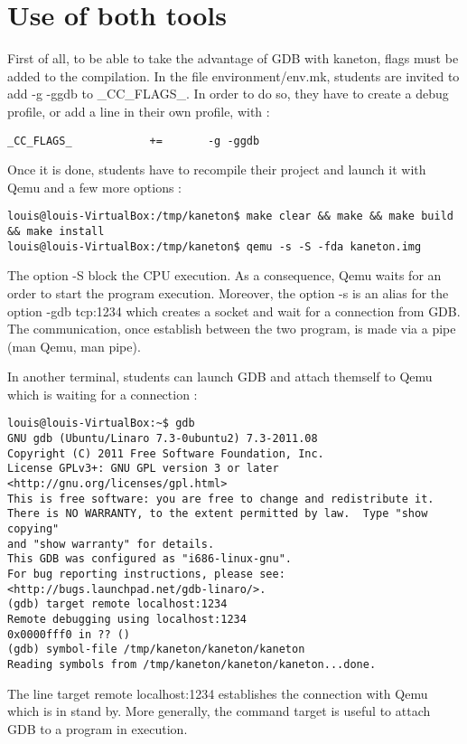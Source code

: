 \section{Use of both tools}


First of all, to be able to take the advantage of GDB with kaneton, flags must be added to the compilation. In the file environment/env.mk, students are invited to add -g -ggdb to \_CC\_FLAGS\_. In order to do so, they have to create a debug profile, or add a line in their own profile, with :
\begin{verbatim}
_CC_FLAGS_            +=       -g -ggdb
\end{verbatim}

Once it is done, students have to recompile their project and launch it with Qemu and a few more options :
\begin{verbatim}
louis@louis-VirtualBox:/tmp/kaneton$ make clear && make && make build && make install
louis@louis-VirtualBox:/tmp/kaneton$ qemu -s -S -fda kaneton.img
\end{verbatim}

The option -S block the CPU execution. As a consequence, Qemu waits for an order to start the program execution. Moreover, the option -s is an alias for the option -gdb tcp:1234 which creates a socket and wait for a connection from GDB. The communication, once establish between the two program, is made via a pipe (man Qemu, man pipe).

In another terminal, students can launch GDB and attach themself to Qemu which is waiting for a connection :
\begin{verbatim}
louis@louis-VirtualBox:~$ gdb
GNU gdb (Ubuntu/Linaro 7.3-0ubuntu2) 7.3-2011.08
Copyright (C) 2011 Free Software Foundation, Inc.
License GPLv3+: GNU GPL version 3 or later <http://gnu.org/licenses/gpl.html>
This is free software: you are free to change and redistribute it.
There is NO WARRANTY, to the extent permitted by law.  Type "show copying"
and "show warranty" for details.
This GDB was configured as "i686-linux-gnu".
For bug reporting instructions, please see:
<http://bugs.launchpad.net/gdb-linaro/>.
(gdb) target remote localhost:1234
Remote debugging using localhost:1234
0x0000fff0 in ?? ()
(gdb) symbol-file /tmp/kaneton/kaneton/kaneton
Reading symbols from /tmp/kaneton/kaneton/kaneton...done.
\end{verbatim}

The line target remote localhost:1234 establishes the connection with Qemu which is in stand by. More generally, the command target is useful to attach GDB to a program in execution.

